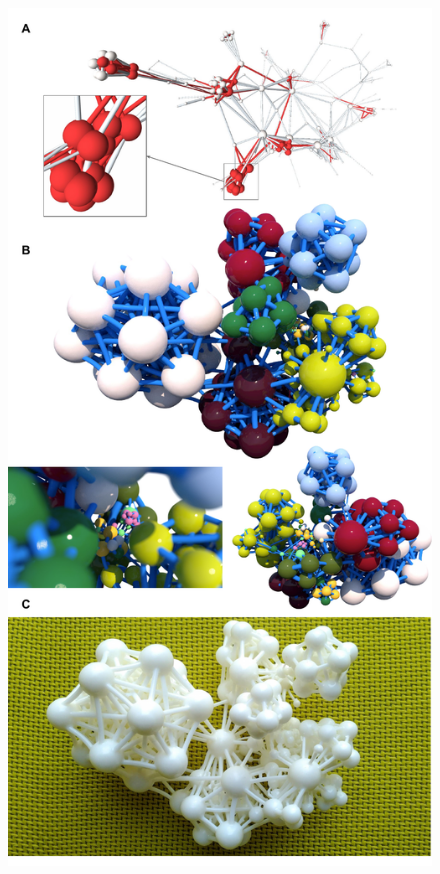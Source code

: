 \documentclass[nofootinbib,preprint,floatfix,titlepage,endfloats,superscriptaddress]{revtex4} %
\begin{document}
\begin{figure}
    \includegraphics[height=\textheight
    ]{fig-09-19/3D-flavor-panel-110217.pdf}
    

\end{figure}
\end{document}
